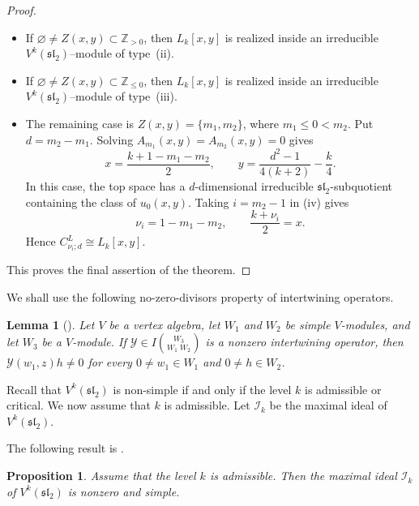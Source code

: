 \documentclass[11 pt]{amsart}
\newtheorem{lemma}{Lemma}
\newtheorem{proposition}{Proposition}
\theoremstyle{definition}
\theoremstyle{plain}
\begin{document}
\begin{proof}
\begin{itemize}
\item If
$\varnothing\neq Z(x,y)\subset\mathbb Z_{>0}$, then $L_k[x,y]$ is
realized inside an irreducible $V^k(\mathfrak{sl}_2)$--module of
type~\textup{(ii)}.

\item If
$\varnothing\neq Z(x,y)\subset\mathbb Z_{\leq0}$, then $L_k[x,y]$ is
realized inside an irreducible $V^k(\mathfrak{sl}_2)$--module of
type~\textup{(iii)}.

\item The remaining case is
$Z(x,y)=\{m_1,m_2\}$, where $m_1\leq0<m_2$.
Put $d=m_2-m_1$. Solving
$A_{m_1}(x,y)=A_{m_2}(x,y)=0$ gives
\[
x=\frac{k+1-m_1-m_2}{2},
\qquad
y=\frac{d^2-1}{4(k+2)}-\frac{k}{4}.
\]
In this case, the top space has a $d$-dimensional irreducible
$\mathfrak{sl}_2$-subquotient containing the class of $u_0(x,y)$.
Taking $i=m_2-1$ in \textup{(iv)} gives
\[
  \nu_i=1-m_1-m_2,
  \qquad
  \frac{k+\nu_i}{2}=x.
\]
Hence $C^L_{\nu_i;d}\cong L_k[x,y]$.
\end{itemize}

This proves the final assertion of the theorem.
\end{proof}


We shall use the following no-zero-divisors property of intertwining
operators.
\begin{lemma}[{\cite{DL}}]\label{lem:nonzero-divisor}
Let $V$ be a vertex algebra, let $W_1$ and $W_2$ be simple
$V$-modules, and let $W_3$ be a $V$-module. If
$\mathcal Y\in I\binom{W_3}{W_1\;W_2}$ is a nonzero intertwining
operator, then $\mathcal Y(w_1,z)h\neq0$
for every $0\neq w_1\in W_1$ and $0\neq h\in W_2$.
\end{lemma}



Recall that $V^k(\mathfrak{sl}_2)$ is non-simple if and only if the
level $k$ is admissible or critical. We now assume that $k$ is
admissible. Let $\mathcal I_k$ be the maximal ideal of
$V^k(\mathfrak{sl}_2)$.




The following result is \cite[Theorem~5.3]{AKMPP17}.

\begin{proposition}\label{prop:Ik-irreducible}
Assume that the level  $k$ is admissible. Then the maximal ideal $\mathcal I_k$ of
$V^k(\mathfrak{sl}_2)$ is nonzero and simple.
\end{proposition}
\end{document}
